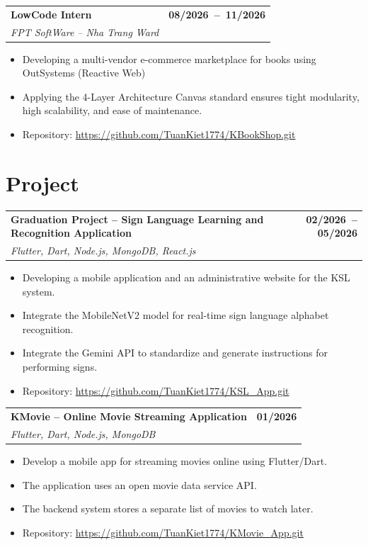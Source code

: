 \documentclass[11pt,a4paper]{article}
\makeatletter
\newcommand{\cvproject}[3]{%
  \begin{tabularx}{\linewidth}
    {@{}>{\raggedright\arraybackslash}X
    @{\hspace{1em}}
    r@{}}

    \textbf{#1} &
    \mbox{\textbf{#3}}
    \\[0.05em]

    \textit{#2} &
  \end{tabularx}
  \vspace{-0.20em}
}
\makeatother
\begin{document}
\cvproject
  {LowCode Intern}
  {FPT SoftWare -- Nha Trang Ward}
  {08/2026 -- 11/2026}

\begin{itemize}
  \item Developing a multi-vendor e-commerce marketplace for books using OutSystems (Reactive Web)
  \item Applying the 4-Layer Architecture Canvas standard ensures tight modularity, high scalability, and ease of maintenance.
  \item Repository: \href{https://github.com/TuanKiet1774/KBookShop.git}
    {https://github.com/TuanKiet1774/KBookShop.git}
\end{itemize}

\section{Project}

\cvproject
  {Graduation Project -- Sign Language Learning and Recognition Application}
  {
    Flutter, Dart, Node.js, MongoDB, React.js
  }
  {02/2026 -- 05/2026}

\begin{itemize}
  \item Developing a mobile application and an administrative website
        for the KSL system.
  \item Integrate the MobileNetV2 model for real-time sign language alphabet recognition.
  \item Integrate the Gemini API to standardize and generate
        instructions for performing signs.
  \item Repository: \href{https://github.com/TuanKiet1774/KSL_App.git}
    {https://github.com/TuanKiet1774/KSL_App.git}
\end{itemize}

\cvproject
  {KMovie -- Online Movie Streaming Application}
  {
    Flutter, Dart, Node.js, MongoDB
  }
  {01/2026}

\begin{itemize}
  \item Develop a mobile app for streaming movies online using Flutter/Dart.
  \item The application uses an open movie data service API.
  \item The backend system stores a separate list of movies to watch later.
  \item Repository: \href{https://github.com/TuanKiet1774/KMovie_App.git}
    {https://github.com/TuanKiet1774/KMovie_App.git}
\end{itemize}
\end{document}
